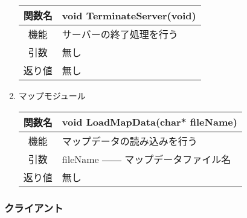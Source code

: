 \documentclass{jarticle}
\begin{document}
\begin{enumerate}
\begin{table}[H]
    \end{table}
    \begin{table}[H]
        \label{table:fanc_s1-4}
        \begin{center}
            \begin{tabular}{|c||p{30em}|}\hline
                関数名&void TerminateServer(void)  \\\hline
                機能&サーバーの終了処理を行う\\
                引数&無し\\
                返り値&無し\\\hline
            \end{tabular}
        \end{center}
    \end{table}
    \item マップモジュール
    \begin{table}[H]
        \label{table:fanc_s2-1}
        \begin{center}
            \begin{tabular}{|c||p{30em}|}\hline
                関数名&void LoadMapData(char* fileName)\\\hline
                機能&マップデータの読み込みを行う\\
                引数&fileName ―― マップデータファイル名\\
                返り値&無し\\\hline
            \end{tabular}
        \end{center}
    \end{table}
\end{enumerate}

\subsubsection{クライアント}
\end{document}
